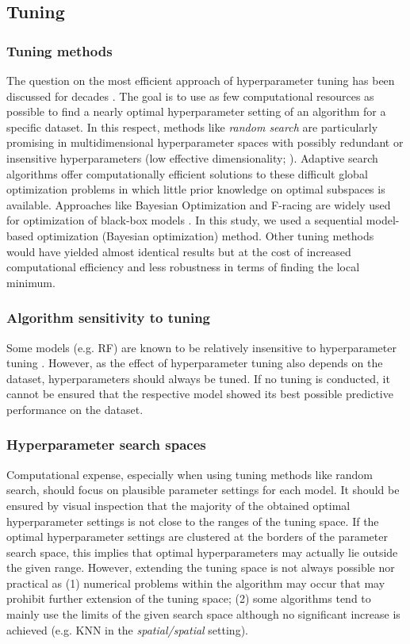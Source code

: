 \documentclass[review]{elsarticle}
\begin{document}
\subsection{Tuning}

\subsubsection{Tuning methods} 
The question on the most efficient approach of hyperparameter tuning has been discussed for decades \citep{Bengio2000, Probst2018a, Yang2017}.
The goal is to use as few computational resources as possible to find a nearly optimal hyperparameter setting of an algorithm for a specific dataset.
In this respect, methods like \textit{random search} are particularly promising in multidimensional hyperparameter spaces with possibly redundant or insensitive hyperparameters (low effective dimensionality; \citep{Bergstra2012}).
Adaptive search algorithms offer computationally efficient solutions to these difficult global optimization problems in which little prior knowledge on optimal subspaces is available.
Approaches like Bayesian Optimization and F-racing are widely used for optimization of black-box models \citep{Birattari2002, mlrMBO, Brochu2010, Malkomes2016}.
In this study, we used a sequential model-based optimization (Bayesian optimization) method.
Other tuning methods would have yielded almost identical results but at the cost of increased computational efficiency and less robustness in terms of finding the local minimum.

\subsubsection{Algorithm sensitivity to tuning}
Some models (e.g. \ac{RF}) are known to be relatively insensitive to hyperparameter tuning \citep{Probst2018b}.
However, as the effect of hyperparameter tuning also depends on the dataset, hyperparameters should always be tuned.
If no tuning is conducted, it cannot be ensured that the respective model showed its best possible predictive performance on the dataset.

\subsubsection{Hyperparameter search spaces}
Computational expense, especially when using tuning methods like random search, should focus on plausible parameter settings for each model.
It should be ensured by visual inspection that the majority of the obtained optimal hyperparameter settings is not close to the ranges of the tuning space.
If the optimal hyperparameter settings are clustered at the borders of the parameter search space, this implies that optimal hyperparameters may actually lie outside the given range.
However, extending the tuning space is not always possible nor practical as (1) numerical problems within the algorithm may occur that may prohibit further extension of the tuning space; (2) some algorithms tend to mainly use the limits of the given search space although no significant increase is achieved (e.g. KNN in the \emph{spatial/spatial} setting).
\end{document}
